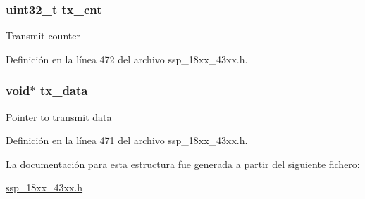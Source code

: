 \subsubsection[{\texorpdfstring{tx\+\_\+cnt}{tx_cnt}}]{\setlength{\rightskip}{0pt plus 5cm}uint32\+\_\+t tx\+\_\+cnt}\hypertarget{struct_chip___s_s_p___d_a_t_a___s_e_t_u_p___t_a0441520d3f5ed5b07bfb4889dd495b86}{}\label{struct_chip___s_s_p___d_a_t_a___s_e_t_u_p___t_a0441520d3f5ed5b07bfb4889dd495b86}
Transmit counter 

Definición en la línea 472 del archivo ssp\+\_\+18xx\+\_\+43xx.\+h.

\subsubsection[{\texorpdfstring{tx\+\_\+data}{tx_data}}]{\setlength{\rightskip}{0pt plus 5cm}void$\ast$ tx\+\_\+data}\hypertarget{struct_chip___s_s_p___d_a_t_a___s_e_t_u_p___t_ac5b2b9db8286b9c85c956556cfa42b92}{}\label{struct_chip___s_s_p___d_a_t_a___s_e_t_u_p___t_ac5b2b9db8286b9c85c956556cfa42b92}
Pointer to transmit data 

Definición en la línea 471 del archivo ssp\+\_\+18xx\+\_\+43xx.\+h.



La documentación para esta estructura fue generada a partir del siguiente fichero\+:\begin{DoxyCompactItemize}
\item 
\hyperlink{ssp__18xx__43xx_8h}{ssp\+\_\+18xx\+\_\+43xx.\+h}\end{DoxyCompactItemize}
